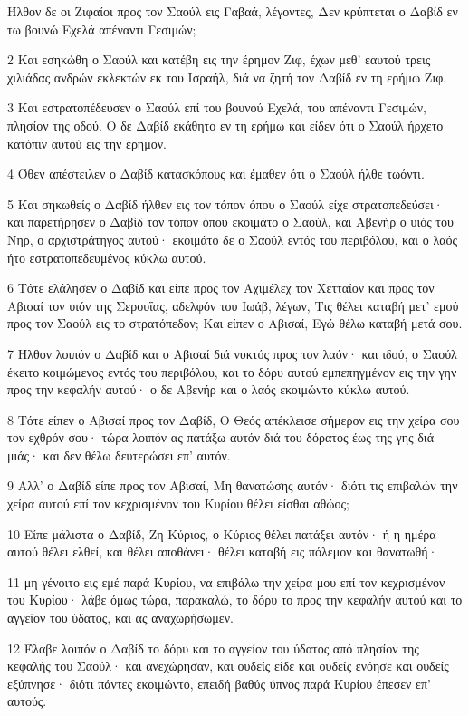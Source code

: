 \par Ήλθον δε οι Ζιφαίοι προς τον Σαούλ εις Γαβαά, λέγοντες, Δεν κρύπτεται ο Δαβίδ εν τω βουνώ Εχελά απέναντι Γεσιμών;
\par 2 Και εσηκώθη ο Σαούλ και κατέβη εις την έρημον Ζιφ, έχων μεθ' εαυτού τρεις χιλιάδας ανδρών εκλεκτών εκ του Ισραήλ, διά να ζητή τον Δαβίδ εν τη ερήμω Ζιφ.
\par 3 Και εστρατοπέδευσεν ο Σαούλ επί του βουνού Εχελά, του απέναντι Γεσιμών, πλησίον της οδού. Ο δε Δαβίδ εκάθητο εν τη ερήμω και είδεν ότι ο Σαούλ ήρχετο κατόπιν αυτού εις την έρημον.
\par 4 Όθεν απέστειλεν ο Δαβίδ κατασκόπους και έμαθεν ότι ο Σαούλ ήλθε τωόντι.
\par 5 Και σηκωθείς ο Δαβίδ ήλθεν εις τον τόπον όπου ο Σαούλ είχε στρατοπεδεύσει· και παρετήρησεν ο Δαβίδ τον τόπον όπου εκοιμάτο ο Σαούλ, και Αβενήρ ο υιός του Νηρ, ο αρχιστράτηγος αυτού· εκοιμάτο δε ο Σαούλ εντός του περιβόλου, και ο λαός ήτο εστρατοπεδευμένος κύκλω αυτού.
\par 6 Τότε ελάλησεν ο Δαβίδ και είπε προς τον Αχιμέλεχ τον Χετταίον και προς τον Αβισαί τον υιόν της Σερουΐας, αδελφόν του Ιωάβ, λέγων, Τις θέλει καταβή μετ' εμού προς τον Σαούλ εις το στρατόπεδον; Και είπεν ο Αβισαί, Εγώ θέλω καταβή μετά σου.
\par 7 Ήλθον λοιπόν ο Δαβίδ και ο Αβισαί διά νυκτός προς τον λαόν· και ιδού, ο Σαούλ έκειτο κοιμώμενος εντός του περιβόλου, και το δόρυ αυτού εμπεπηγμένον εις την γην προς την κεφαλήν αυτού· ο δε Αβενήρ και ο λαός εκοιμώντο κύκλω αυτού.
\par 8 Τότε είπεν ο Αβισαί προς τον Δαβίδ, Ο Θεός απέκλεισε σήμερον εις την χείρα σου τον εχθρόν σου· τώρα λοιπόν ας πατάξω αυτόν διά του δόρατος έως της γης διά μιάς· και δεν θέλω δευτερώσει επ' αυτόν.
\par 9 Αλλ' ο Δαβίδ είπε προς τον Αβισαί, Μη θανατώσης αυτόν· διότι τις επιβαλών την χείρα αυτού επί τον κεχρισμένον του Κυρίου θέλει είσθαι αθώος;
\par 10 Είπε μάλιστα ο Δαβίδ, Ζη Κύριος, ο Κύριος θέλει πατάξει αυτόν· ή η ημέρα αυτού θέλει ελθεί, και θέλει αποθάνει· θέλει καταβή εις πόλεμον και θανατωθή·
\par 11 μη γένοιτο εις εμέ παρά Κυρίου, να επιβάλω την χείρα μου επί τον κεχρισμένον του Κυρίου· λάβε όμως τώρα, παρακαλώ, το δόρυ το προς την κεφαλήν αυτού και το αγγείον του ύδατος, και ας αναχωρήσωμεν.
\par 12 Έλαβε λοιπόν ο Δαβίδ το δόρυ και το αγγείον του ύδατος από πλησίον της κεφαλής του Σαούλ· και ανεχώρησαν, και ουδείς είδε και ουδείς ενόησε και ουδείς εξύπνησε· διότι πάντες εκοιμώντο, επειδή βαθύς ύπνος παρά Κυρίου έπεσεν επ' αυτούς.
